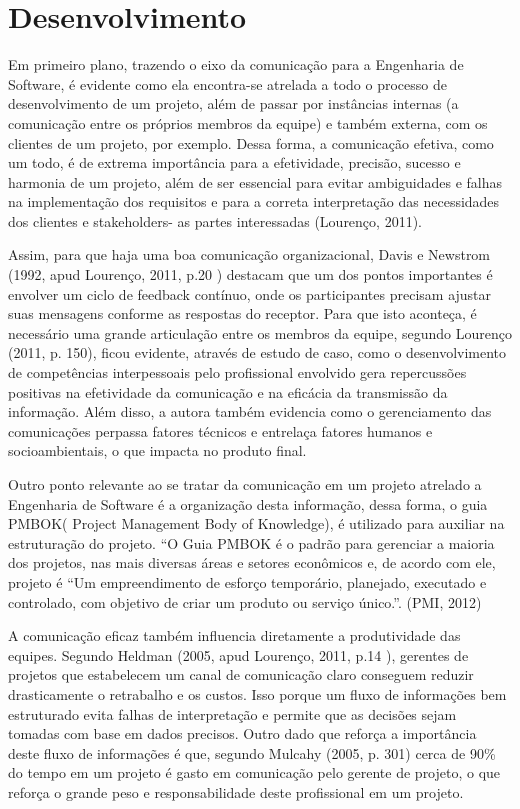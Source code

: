 \documentclass[12pt,oneside,a4paper,article]{abntex2}
\begin{document}
\section{Desenvolvimento}

Em primeiro plano, trazendo o eixo da comunicação para a Engenharia de Software, é evidente como ela encontra-se atrelada a todo o processo de desenvolvimento de um projeto, além de  passar por instâncias internas (a comunicação entre os próprios membros da equipe) e também externa, com os clientes de um projeto, por exemplo. Dessa forma, a comunicação efetiva, como um todo, é de extrema importância para a efetividade, precisão, sucesso e harmonia de um projeto, além de ser essencial para evitar ambiguidades e falhas na implementação dos requisitos e para a correta interpretação das necessidades dos clientes e stakeholders- as partes interessadas (Lourenço, 2011).

Assim, para que haja uma boa comunicação organizacional, Davis e Newstrom (1992, apud Lourenço, 2011, p.20 ) destacam que um dos pontos importantes é envolver um ciclo de feedback contínuo, onde os participantes precisam ajustar suas mensagens conforme as respostas do receptor. Para que isto aconteça, é necessário uma grande articulação entre os membros da equipe, segundo Lourenço (2011, p. 150), ficou evidente, através de estudo de caso, como o desenvolvimento de competências interpessoais pelo profissional envolvido gera repercussões positivas na efetividade da comunicação e na eficácia da transmissão da informação. Além disso, a autora também evidencia como o gerenciamento das comunicações  perpassa fatores técnicos e entrelaça fatores humanos e socioambientais, o que impacta no produto final.

Outro ponto relevante ao se tratar da comunicação em um projeto atrelado a Engenharia de Software é a organização desta informação, dessa forma, o guia PMBOK( Project Management Body of Knowledge), é utilizado para auxiliar na estruturação do projeto. 
“O Guia PMBOK é o padrão para gerenciar a maioria dos projetos, nas mais diversas áreas e setores econômicos e, de acordo com ele, projeto é “Um empreendimento de esforço temporário, planejado, executado e controlado, com objetivo de criar um produto ou serviço único.”. (PMI, 2012)

A comunicação eficaz também influencia diretamente a produtividade das equipes. Segundo Heldman (2005, apud Lourenço, 2011, p.14 ), gerentes de projetos que estabelecem um canal de comunicação claro conseguem reduzir drasticamente o retrabalho e os custos. Isso porque um fluxo de informações bem estruturado evita falhas de interpretação e permite que as decisões sejam tomadas com base em dados precisos. Outro dado que reforça a importância deste fluxo de informações é que, segundo Mulcahy (2005, p. 301) cerca de 90\% do tempo em um projeto é gasto em comunicação pelo gerente de projeto, o que reforça o grande peso e responsabilidade deste profissional em um projeto.
\end{document}
